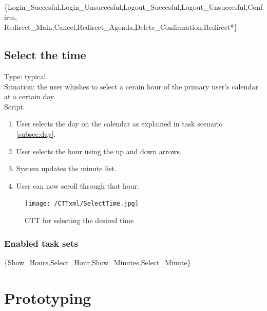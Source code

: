 \documentclass[11pt, a4paper,svglistings]{report}
\begin{document}
\{Login\_Succesful,Login\_Unsuccesful,Logout\_Succesful,Logout\_Unsuccesful,Confirm, \\ Redirect\_Main,Cancel,Redirect\_Agenda,Delete\_Confirmation,Redirect*\}


\newpage

\section{Select the time}

\label{subsec:hour}Type: typical \\
Situation: the user whishes to select a cerain hour  of the primary user's calendar at a certain day. \\
Script:
\begin{enumerate}
\item User selects the day on the calendar as explained in task scenario \ref{subsec:day}.
\item User selects the hour using the up and down arrows.
\item System updates the minute list.
\item User can now scroll through that hour.
\end{enumerate}

\begin{figure}[H]
\centering
    \texttt{[image: /CTTxml/SelectTime.jpg]}
  \caption[Select time CTT]{\label{fig:SelectTimeCTT}CTT for selecting the desired time}
\end{figure}

\subsection{Enabled task sets}

\{Show\_Hours,Select\_Hour,Show\_Minutes,Select\_Minute\}


\chapter{Prototyping}
\end{document}
